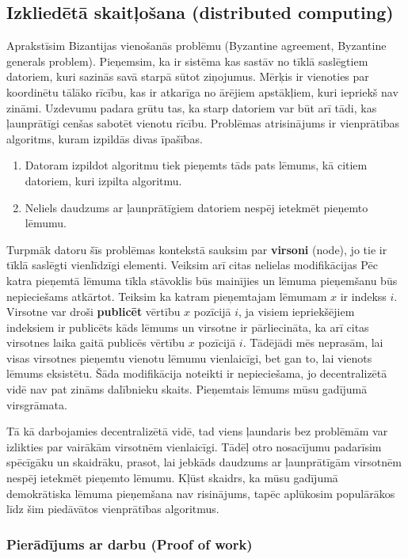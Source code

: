 \subsection{Izkliedētā skaitļošana (distributed computing)}
Aprakstīsim Bizantijas vienošanās problēmu (Byzantine agreement, Byzantine generals problem).
Pieņemsim, ka ir sistēma kas sastāv no tīklā saslēgtiem datoriem, kuri sazinās savā starpā sūtot ziņojumus. Mērķis ir vienoties par koordinētu tālāko rīcību, kas ir atkarīga no ārējiem apstākļiem, kuri iepriekš nav zināmi. Uzdevumu padara grūtu tas, ka starp datoriem var būt arī tādi, kas ļaunprātīgi cenšas sabotēt vienotu rīcību.
Problēmas atrisinājums ir vienprātības algoritms, kuram izpildās divas īpašības.
\begin{enumerate}
    \item Datoram izpildot algoritmu tiek pieņemts tāds pats lēmums, kā citiem datoriem, kuri izpilta algoritmu.
    \item Neliels daudzums ar ļaunprātīgiem datoriem nespēj ietekmēt pieņemto lēmumu.
\end{enumerate}\cite{lamport82}
Turpmāk datoru šīs problēmas kontekstā sauksim par \textbf{virsoni} (node), jo tie ir tīklā saslēgti vienlīdzīgi elementi. Veiksim arī citas nelielas modifikācijas
Pēc katra pieņemtā lēmuma tīkla stāvoklis būs mainījies un lēmuma pieņemšanu būs nepieciešams atkārtot. Teiksim ka katram pieņemtajam lēmumam $x$ ir indekss $i$. Virsotne var droši \textbf{publicēt} vērtību $x$ pozīcijā $i$, ja visiem iepriekšējiem indeksiem ir publicēts kāds lēmums un virsotne ir pārliecināta, ka arī citas virsotnes laika gaitā publicēs vērtību $x$ pozīcijā $i$.\cite{mazieres15} Tādējādi mēs neprasām, lai visas virsotnes pieņemtu vienotu lēmumu vienlaicīgi, bet gan to, lai vienots lēmums eksistētu. Šāda modifikācija noteikti ir nepieciešama, jo decentralizētā vidē nav pat zināms dalībnieku skaits.
Pieņemtais lēmums mūsu gadījumā virsgrāmata.

Tā kā darbojamies decentralizētā vidē, tad viens ļaundaris bez problēmām var izlikties par vairākām virsotnēm vienlaicīgi. Tādēļ otro nosacījumu padarīsim spēcīgāku un skaidrāku, prasot, lai jebkāds daudzums ar ļaunprātīgām virsotnēm nespēj ietekmēt pieņemto lēmumu.
Kļūst skaidrs, ka mūsu gadījumā demokrātiska lēmuma pieņemšana nav risinājums, tapēc aplūkosim populārākos līdz šim piedāvātos vienprātības algoritmus.

\subsubsection{Pierādījums ar darbu (Proof of work)}
